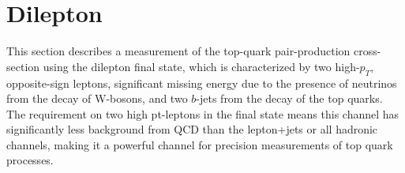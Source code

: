
\newcommand{\dr} {\ensuremath{\Delta R({\rm lepton},{\rm jet})}}
\newcommand{\pmasym}[2]{^{+#1}_{-#2}}
\newcommand{\sigmattbar}{\ensuremath{\sigma_{\ttbar}}}
\newcommand{\sigmaz}{\ensuremath{\sigma_{\Zboson}}}
\newcommand{\lumitot}{\mbox{0.70~fb$^{-1}$}}
\newcommand{\lumitotpm}{\mbox{0.70$\pm$0.03~fb$^{-1}$}}

\newcommand{\xsectot}{171}
\newcommand{\xsecstat}{\pm 6}
\newcommand{\xsecsyst}{\pmasym{16}{14}}
\newcommand{\xseclumi}{\pm 8}

\newcommand{\xsecbtot}{177}
\newcommand{\xsecbstat}{\pm 6}
\newcommand{\xsecbsyst}{\pmasym {17}{14}}
\newcommand{\xsecblumi}{\pmasym {8}{7}}


\newcommand{\AKT}{anti-k$_{t}$}
\def\lum{{\ensuremath{\cal L}}}
\def \intlum {\int {\cal L} dt}
\def\MCatNLO{{\sc MC@NLO}}
\def\FigMerit{F_M}
\def\JetProb{{\sc JetProb}}
\def\SVZero{{\sc SV0}}
\def\Nn{N_n}  %
\def\Zg{\Zboson/\gamma^{*}}
\def\GEANT{{\sc GEANT4}}

\section{Dilepton}





This section describes a measurement of the top-quark pair-production cross-section using the
dilepton final state, which is characterized by two high-$p_T$, opposite-sign leptons,
significant missing energy due to the presence of neutrinos from the decay of W-bosons,
and two $b$-jets from the decay of the top quarks.
The requirement on two high pt-leptons in the final state means this channel has
significantly less background from QCD than the lepton+jets or all hadronic channels,
making it a powerful channel for precision measurements of top quark processes.


